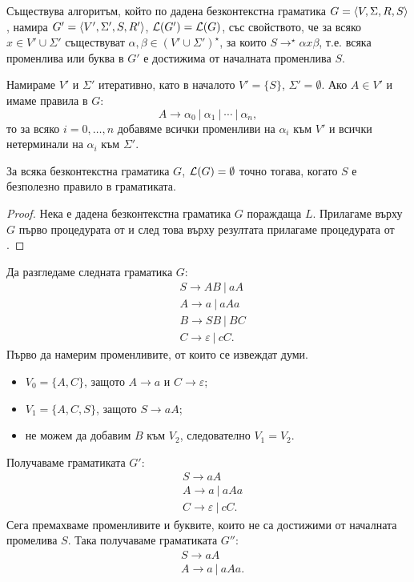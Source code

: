 \begin{lemma}
  \label{lem:useless2}
  Съществува алгоритъм, който по дадена безконтекстна граматика $G = \langle{V,\Sigma,R,S}\rangle$, намира $G' = \langle{V',\Sigma',S,R'}\rangle$, $\mathcal{L}(G') = \mathcal{L}(G)$,
  със свойството, че за всяко $x \in V' \cup \Sigma'$ съществуват $\alpha, \beta \in (V'\cup\Sigma')^\star$,
  за които $S \to^\star \alpha x \beta$,
  т.е. всяка променлива или буква в $G'$ е достижима от началната променлива $S$.
\end{lemma}
\begin{hint}
  Намираме $V'$ и $\Sigma'$ итеративно, като в началото $V' = \{S\}$, $\Sigma' = \emptyset$.
  Ако $A \in V'$ и имаме правила в $G$:
  \[A \to \alpha_0\ |\ \alpha_1\ |\ \cdots\ |\ \alpha_n,\]
  то за всяко $i = 0,\dots,n$ добавяме всички променливи на $\alpha_i$ към $V'$ и всички нетерминали на $\alpha_i$ към $\Sigma'$.
\end{hint}

\begin{thm}
  За всяка безконтекстна граматика $G$, $\mathcal{L}(G) = \emptyset$ точно тогава, когато $S$ е безполезно правило в граматиката.
\end{thm}
\begin{proof}
  Нека е дадена безконтекстна граматика $G$ пораждаща $L$.
  Прилагаме върху $G$ първо процедурата от  и след това върху резултата прилагаме процедурата от .
\end{proof}

\begin{example}
  Да разгледаме следната граматика $G$:
  \begin{align*}
    & S \to AB\ |\ aA\\
    & A \to a\ |\ aAa\\
    & B \to SB\ |\ BC\\
    & C \to \varepsilon\ |\ cC.
  \end{align*}
  Първо да намерим променливите, от които се извеждат думи.
  \begin{itemize}
  \item 
    $V_0 = \{A, C\}$, защото $A \to a$ и $C \to \varepsilon$;
  \item
    $V_1 = \{A, C, S\}$, защото $S \to aA$;
  \item
    не можем да добавим $B$ към $V_2$, следователно $V_1 = V_2$.
  \end{itemize}
  Получаваме граматиката $G'$:
  \begin{align*}
    & S \to aA\\
    & A \to a\ |\ aAa\\
    & C \to \varepsilon\ |\ cC.
  \end{align*}
  Сега премахваме променливите и буквите, които не са достижими от началната промелива $S$. Така получаваме граматиката $G''$:
  \begin{align*}
    & S \to aA\\
    & A \to a\ |\ aAa.
  \end{align*}
\end{example}


